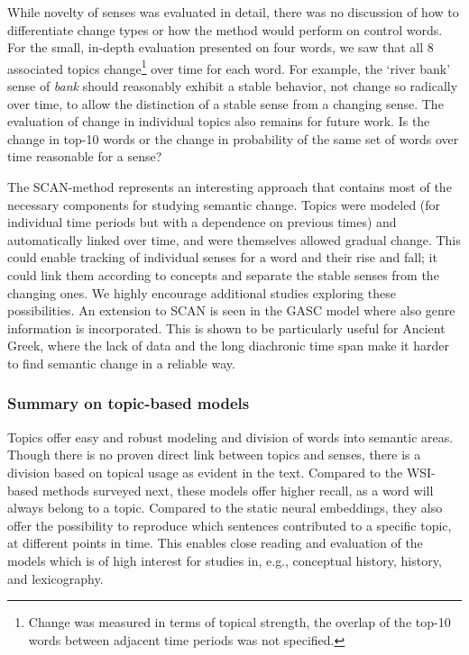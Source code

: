 \documentclass[output=paper]{langsci/langscibook}
\begin{document}
While novelty of senses was evaluated in detail, there was no discussion of how to differentiate change types or how the method would perform on control words. For the small, in-depth evaluation presented on four words, we saw that all 8 associated topics change\footnote{Change was measured in terms of topical strength, the overlap of the top-10 words between adjacent time periods was not specified.} over time for each word. For example, the `river bank' sense of \emph{bank} should reasonably exhibit a stable behavior, not change so radically over time, to allow the distinction of a stable sense from a changing sense. 
The evaluation of change in individual topics also remains for future work. Is the change in top-10 words or the change in probability of the same set of words over time reasonable for a sense?\largerpage

The SCAN-method represents an interesting approach that contains most of the necessary components for studying semantic change. Topics were modeled (for individual time periods but with a dependence on previous times) and automatically linked over time, and  were  themselves allowed gradual change. This could enable tracking of individual senses for a word and their rise and fall; it could link them according to concepts and separate the stable senses from the changing ones. 
We highly encourage additional studies exploring these possibilities. 
An extension to SCAN is seen in the GASC model \citep{perrone-etal-2019-gasc} where also genre information is incorporated. This is shown to be particularly useful for Ancient Greek, where the lack of data and the long diachronic time span make it harder to find semantic change in a reliable way.

\subsubsection{Summary on topic-based models} Topics offer  easy and robust modeling and division of words into semantic areas. Though there is no proven direct link between topics and senses, there is a division based on topical usage as evident in the text. Compared to the WSI-based methods surveyed next, these models offer higher recall, as a word will always belong to a topic. Compared to the static neural embeddings, they also offer the possibility to reproduce which sentences contributed to a specific topic, at different points in time. This enables close reading and evaluation of the models which is of high interest for studies in, e.g., conceptual history, history, and lexicography. 
\end{document}
